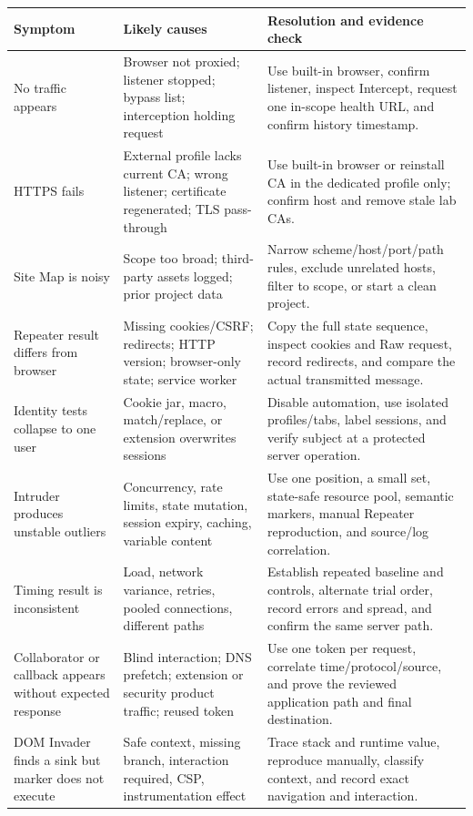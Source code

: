 \documentclass[11pt]{article}
\begin{document}
\small
\begin{longtable}{@{}L{0.23\textwidth}L{0.29\textwidth}L{0.38\textwidth}@{}}
\toprule
\textbf{Symptom} & \textbf{Likely causes} & \textbf{Resolution and evidence check} \\
\midrule
\endhead
No traffic appears & Browser not proxied; listener stopped; bypass list; interception holding request & Use built-in browser, confirm listener, inspect Intercept, request one in-scope health URL, and confirm history timestamp. \\
HTTPS fails & External profile lacks current CA; wrong listener; certificate regenerated; TLS pass-through & Use built-in browser or reinstall CA in the dedicated profile only; confirm host and remove stale lab CAs. \\
Site Map is noisy & Scope too broad; third-party assets logged; prior project data & Narrow scheme/host/port/path rules, exclude unrelated hosts, filter to scope, or start a clean project. \\
Repeater result differs from browser & Missing cookies/CSRF; redirects; HTTP version; browser-only state; service worker & Copy the full state sequence, inspect cookies and Raw request, record redirects, and compare the actual transmitted message. \\
Identity tests collapse to one user & Cookie jar, macro, match/replace, or extension overwrites sessions & Disable automation, use isolated profiles/tabs, label sessions, and verify subject at a protected server operation. \\
Intruder produces unstable outliers & Concurrency, rate limits, state mutation, session expiry, caching, variable content & Use one position, a small set, state-safe resource pool, semantic markers, manual Repeater reproduction, and source/log correlation. \\
Timing result is inconsistent & Load, network variance, retries, pooled connections, different paths & Establish repeated baseline and controls, alternate trial order, record errors and spread, and confirm the same server path. \\
Collaborator or callback appears without expected response & Blind interaction; DNS prefetch; extension or security product traffic; reused token & Use one token per request, correlate time/protocol/source, and prove the reviewed application path and final destination. \\
DOM Invader finds a sink but marker does not execute & Safe context, missing branch, interaction required, CSP, instrumentation effect & Trace stack and runtime value, reproduce manually, classify context, and record exact navigation and interaction. \\

\end{longtable}
\end{document}
